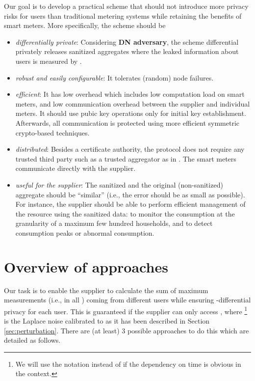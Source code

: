 \documentclass[11pt,a4paper]{article}
\theoremstyle{plain}
\theoremstyle{plain}
\theoremstyle{plain}
\theoremstyle{plain}
\theoremstyle{nonumberplain} \theoremseparator{}
\begin{document}
Our goal is to develop a practical scheme that should not introduce more privacy risks
for users than traditional metering systems while retaining the benefits of smart meters. More specifically, the scheme should be
\begin{itemize}
\item \emph{differentially private}:  Considering \textbf{DN adversary}, the scheme differential privately releases sanitized aggregates  where the leaked information about users is measured by .
\item \emph{robust and easily configurable}: It tolerates (random) node failures.
\item \emph{efficient}: It has low overhead which includes low computation load on smart meters, and low communication overhead between the supplier and individual meters. It should use pubic key operations only for initial key establishment. Afterwards, all communication is protected using more efficient symmetric crypto-based techniques. 
\item \emph{distributed}: Besides a certificate authority, the protocol does not require any trusted third party such as a trusted aggregator as in \cite{bohli10icc}. The smart meters communicate directly with the supplier.
\item \emph{useful for the supplier}: The
sanitized and the original (non-sanitized) aggregate should be ``similar'' (i.e., the error should be as small as possible). For instance, the supplier should be able to perform efficient management of the resource using the sanitized data: to monitor the consumption
at the granularity of a maximum few hundred households, and to detect consumption peaks or abnormal consumption. 
\end{itemize}


\section{Overview of approaches}


Our task is to enable the supplier to calculate the sum of maximum  measurements (i.e.,  in all ) coming from  different
users while ensuring -differential privacy for each user. 
This is guaranteed if the supplier can only access , where  \footnote{We will use the notation  instead of  if the dependency on time is obvious in the context.} is the Laplace noise calibrated to  as it has been described in Section \ref{sec:perturbation}. There are (at least) 3 possible approaches to do this which are detailed as follows.
\end{document}
